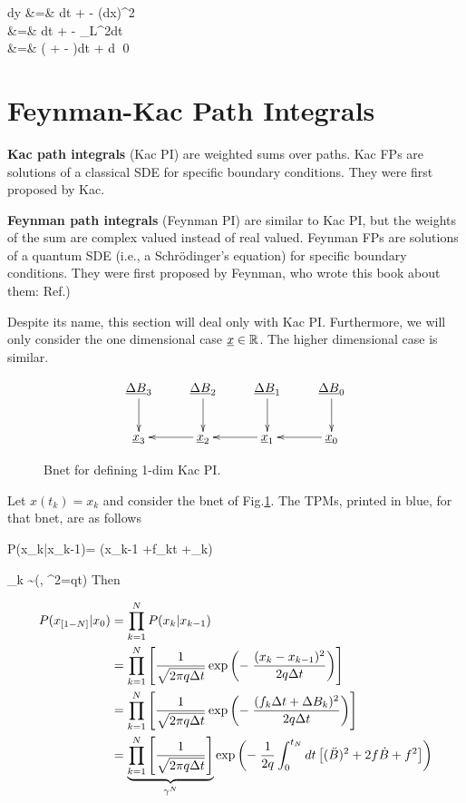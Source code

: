 \beqa
dy &=& dt + 
-\;
(dx)^2
\\
&=&
 dt + 
-\;
_{L^2dt}
\\
&=&
\left(
 +  -
\right)dt + d\rvB
\eeqa
\qed





\section{Feynman-Kac Path Integrals}

{\bf Kac path integrals} (Kac PI)
are weighted sums  over paths. Kac FPs
are solutions of a classical SDE for specific boundary conditions. They were first proposed by Kac.

{\bf Feynman path integrals} (Feynman PI) are similar to Kac PI,
but the weights of the sum are complex valued instead of real valued. Feynman FPs
are solutions of a quantum SDE (i.e., a Schr\"{o}dinger's equation) for specific boundary conditions. They
were first proposed by Feynman,
who  wrote this book
about them: Ref.\cite{feynman-hibbs})

Despite its name,
this section will
deal only with  Kac PI.
Furthermore, we will only
consider the
one dimensional case $\rvx\in\RR$.
The higher dimensional case
is similar.


\begin{figure}[h!]
$$
\xymatrix{
\ul{\Delta B}_3 \ar[d]
& \ul{\Delta B}_2 \ar[d]
& \ul{\Delta B}_1 \ar[d]
& \ul{\Delta B}_0\ar[d]
\\
\rvx_3
& \rvx _2 \ar[l]
& \rvx_1 \ar[l]
& \rvx_0\ar[l]
}
$$
\caption{Bnet for defining 1-dim Kac PI.}
\label{fig-1dim-kac-pi}
\end{figure}

Let $x(t_k)=x_k$ and consider the bnet
of Fig.\ref{fig-1dim-kac-pi}.
The
TPMs, printed in blue,
for that bnet, are as follows

\beq\color{blue}
P(x_k|x_{k-1})= \indi(x_{k-1}
+f_k\Delta t +\Delta\rvB_k)
\eeq

\beq \color{blue}
\Delta\rvB_k \sim \caln(, \s^2=q\Delta t)
\eeq
Then

\begin{align}
P(x_{[1- N]}|x_0)&=
\prod_{k=1}^N P(x_k|x_{k-1})
\\
&=
\prod_{k=1}^N
\left[
\frac{1}{\sqrt{2\pi q\Delta t}}
\exp\left(
-\;
\frac{(x_k-x_{k-1})^2}{2q\Delta t}
\right)
\right]
\\
&=
\prod_{k=1}^N
\left[
\frac{1}{\sqrt{2\pi q \Delta t}}
\exp\left(
-\;
\frac{(f_k\Delta t + \Delta B_k)^2}{2q\Delta t}
\right)
\right]
\\
&=
\underbrace{\prod_{k=1}^N
\left[
\frac{1}{\sqrt{2\pi q \Delta t}}
\right]}_{\gamma^N}
\exp\left(
-\;
\frac{1}
{2q}\int_0^{t_N}dt
\left[(\ddot{B})^2 +
2f\dot{B} +f^2\right]
\right)
\end{align}



